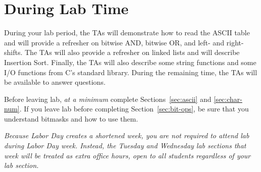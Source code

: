 \section*{During Lab Time}

During your lab period, the TAs will demonstrate how to read the ASCII table and will provide a refresher on bitwise AND, bitwise OR, and left- and right-shifts.
The TAs will also provide a refresher on linked lists and will describe Insertion Sort.
Finally, the TAs will also describe some string functions and some I/O functions from C's standard library.
During the remaining time, the TAs will be available to answer questions.

Before leaving lab, \textit{at a minimum} complete Sections~\ref{sec:ascii} and \ref{sec:char-num}.
If you leave lab before completing Section~\ref{sec:bit-ops}, be sure that you understand bitmasks and how to use them.

\textit{Because Labor Day creates a shortened week, you are not required to attend lab during Labor Day week.
Instead, the Tuesday and Wednesday lab sections that week will be treated as extra office hours, open to all students regardless of your lab section.}

